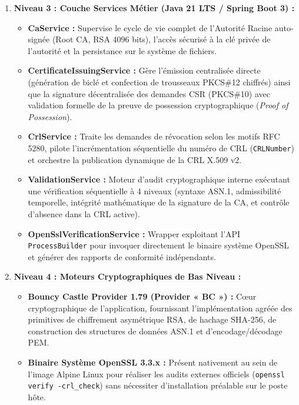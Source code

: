 \documentclass[12pt,a4paper]{report}
\begin{document}
\begin{enumerate}
    \item \textbf{Niveau 3 : Couche Services Métier (Java 21 LTS / Spring Boot 3) :}
    \begin{itemize}
        \item \textbf{CaService :} Supervise le cycle de vie complet de l'Autorité Racine auto-signée (Root CA, RSA 4096 bits), l'accès sécurisé à la clé privée de l'autorité et la persistance sur le système de fichiers.
        \item \textbf{CertificateIssuingService :} Gère l'émission centralisée directe (génération de biclé et confection de trousseaux PKCS\#12 chiffrés) ainsi que la signature décentralisée des demandes CSR (PKCS\#10) avec validation formelle de la preuve de possession cryptographique (\textit{Proof of Possession}).
        \item \textbf{CrlService :} Traite les demandes de révocation selon les motifs RFC 5280, pilote l'incrémentation séquentielle du numéro de CRL (\texttt{CRLNumber}) et orchestre la publication dynamique de la CRL X.509 v2.
        \item \textbf{ValidationService :} Moteur d'audit cryptographique interne exécutant une vérification séquentielle à 4 niveaux (syntaxe ASN.1, admissibilité temporelle, intégrité mathématique de la signature de la CA, et contrôle d'absence dans la CRL active).
        \item \textbf{OpenSslVerificationService :} Wrapper exploitant l'API \texttt{ProcessBuilder} pour invoquer directement le binaire système OpenSSL et générer des rapports de conformité indépendants.
    \end{itemize}

    \item \textbf{Niveau 4 : Moteurs Cryptographiques de Bas Niveau :}
    \begin{itemize}
        \item \textbf{Bouncy Castle Provider 1.79 (Provider « BC ») :} Cœur cryptographique de l'application, fournissant l'implémentation agréée des primitives de chiffrement asymétrique RSA, de hachage SHA-256, de construction des structures de données ASN.1 et d'encodage/décodage PEM.
        \item \textbf{Binaire Système OpenSSL 3.3.x :} Présent nativement au sein de l'image Alpine Linux pour réaliser les audits externes officiels (\texttt{openssl verify -crl\_check}) sans nécessiter d'installation préalable sur le poste hôte.
    \end{itemize}


\end{enumerate}
\end{document}

